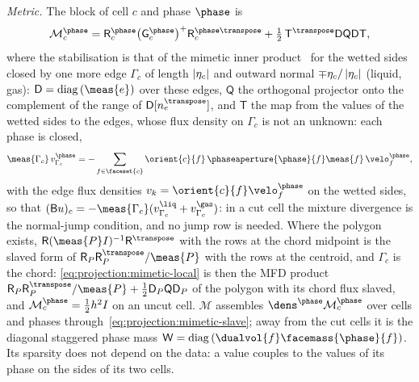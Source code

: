 \emph{Metric.} The block of cell $c$ and phase $\phase$ is
\begin{equation}\label{eq:projection:mimetic-local}
  \mathcal M^{\phase}_c=\mathsf R^{\phase}_c\bigl(\mathsf G^{\phase}_c\bigr)^{+}\mathsf R^{\phase\transpose}_c
  +\tfrac12\,\mathsf T^{\transpose}\mathsf D\mathsf Q\mathsf D\mathsf T,
\end{equation}
where the stabilisation is that of the mimetic inner
product~\cite{brezzi2005b,lipnikov2014} for the wetted sides closed by one more
edge $\Gamma_c$ of length $\left\lvert \eta_c \right\rvert$ and outward normal $\mp\eta_c/\left\lvert \eta_c \right\rvert$
(liquid, gas): $\mathsf D=\diag{\meas{e}}$ over these edges, $\mathsf Q$ the
orthogonal projector onto the complement of the range of $\mathsf D[n_e^{\transpose}]$,
and $\mathsf T$ the map from the values of the wetted sides to the edges,
whose flux density on $\Gamma_c$ is not an unknown: each phase is closed,
\begin{equation}\label{eq:projection:mimetic-slave}
  \meas{\Gamma_c}\,v^{\phase}_{\Gamma_c}=-\sum_{f\in\faceset{c}}\orient{c}{f}\,\phaseaperture{\phase}{f}\meas{f}\,\velo^{\phase}_f ,
\end{equation}
with the edge flux densities $v_k=\orient{c}{f}\velo^{\phase}_f$ on the wetted
sides, so that $(\mathsf Bu)_c=-\meas{\Gamma_c}(v^{\liq}_{\Gamma_c}+v^{\gas}_{\Gamma_c})$:
in a cut cell the mixture divergence is the normal-jump condition, and no
jump row is needed. Where the polygon exists, $\mathsf R(\meas{P}I)^{-1}\mathsf R^{\transpose}$
with the rows at the chord midpoint is the slaved form of
$\mathsf R_P\mathsf R_P^{\transpose}/\meas{P}$ with the rows at the centroid, and
$\Gamma_c$ is the chord: \cref{eq:projection:mimetic-local} is then the MFD
product $\mathsf R_P\mathsf R_P^{\transpose}/\meas{P}+\tfrac12\mathsf D_P\mathsf Q\mathsf D_P$
of the polygon with its chord flux slaved, and
$\mathcal M^{\phase}_c=\tfrac12h^2I$ on an uncut cell. $\mathcal M$ assembles
$\dens^{\phase}\mathcal M^{\phase}_c$ over cells and phases
through~\cref{eq:projection:mimetic-slave}; away from the cut cells it is the
diagonal staggered phase mass $\mathsf W=\diag{\dualvol{f}\facemass{\phase}{f}}$.
Its sparsity does not depend on the data: a value couples to the values of
its phase on the sides of its two cells.

